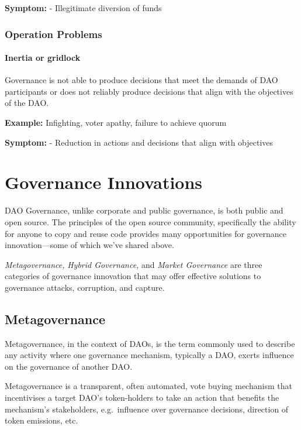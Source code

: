\documentclass[
]{article}
\begin{document}
\textbf{Symptom:} - Illegitimate diversion of funds

\hypertarget{operation-problems}{%
\subsubsection{Operation Problems}\label{operation-problems}}

\hypertarget{inertia-or-gridlock}{%
\paragraph{Inertia or gridlock}\label{inertia-or-gridlock}}

Governance is not able to produce decisions that meet the demands of DAO
participants or does not reliably produce decisions that align with the
objectives of the DAO.

\textbf{Example:} Infighting, voter apathy, failure to achieve quorum

\textbf{Symptom:} - Reduction in actions and decisions that align with
objectives
\hypertarget{governance-innovations}{%
\section{Governance Innovations}\label{governance-innovations}}

DAO Governance, unlike corporate and public governance, is both public
and open source. The principles of the open source community,
specifically the ability for anyone to copy and reuse code provides many
opportunities for governance innovation---some of which we've shared
above.

\emph{Metagovernance,} \emph{Hybrid Governance,} and \emph{Market
Governance} are three categories of governance innovation that may offer
effective solutions to governance attacks, corruption, and capture.

\hypertarget{metagovernance}{%
\subsection{Metagovernance}\label{metagovernance}}

Metagovernance, in the context of DAOs, is the term commonly used to
describe any activity where one governance mechanism, typically a DAO,
exerts influence on the governance of another DAO.

Metagovernance is a transparent, often automated, vote buying mechanism
that incentivises a target DAO's token-holders to take an action that
benefits the mechanism's stakeholders, e.g.~influence over governance
decisions, direction of token emissions, etc.
\end{document}

